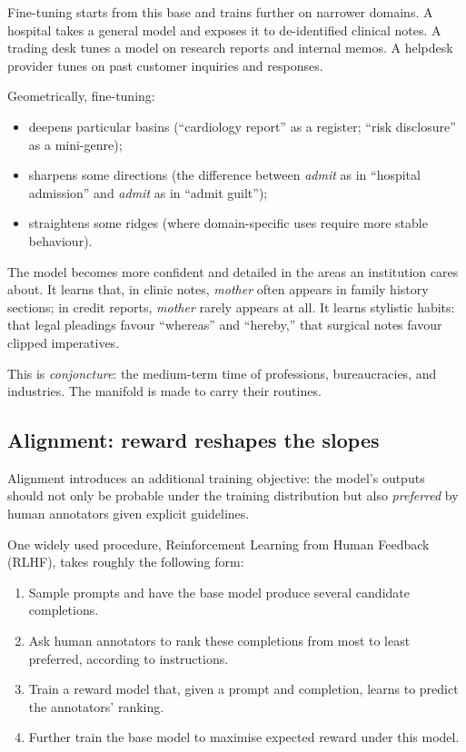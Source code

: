 \documentclass[12pt,a4paper]{article}
\begin{document}
Fine-tuning starts from this base and trains further on narrower domains. A hospital takes a general model and exposes it to de-identified clinical notes. A trading desk tunes a model on research reports and internal memos. A helpdesk provider tunes on past customer inquiries and responses.

Geometrically, fine-tuning:

\begin{itemize}
  \item deepens particular basins (``cardiology report'' as a register; ``risk disclosure'' as a mini-genre);
  \item sharpens some directions (the difference between \emph{admit} as in ``hospital admission'' and \emph{admit} as in ``admit guilt'');
  \item straightens some ridges (where domain-specific uses require more stable behaviour).
\end{itemize}

The model becomes more confident and detailed in the areas an institution cares about. It learns that, in clinic notes, \emph{mother} often appears in family history sections; in credit reports, \emph{mother} rarely appears at all. It learns stylistic habits: that legal pleadings favour ``whereas'' and ``hereby,'' that surgical notes favour clipped imperatives.

This is \emph{conjoncture}: the medium-term time of professions, bureaucracies, and industries. The manifold is made to carry their routines.

\subsection*{Alignment: reward reshapes the slopes}

Alignment introduces an additional training objective: the model's outputs should not only be probable under the training distribution but also \emph{preferred} by human annotators given explicit guidelines.

One widely used procedure, Reinforcement Learning from Human Feedback (RLHF), takes roughly the following form:

\begin{enumerate}
  \item Sample prompts and have the base model produce several candidate completions.
  \item Ask human annotators to rank these completions from most to least preferred, according to instructions.
  \item Train a reward model that, given a prompt and completion, learns to predict the annotators' ranking.
  \item Further train the base model to maximise expected reward under this model.
\end{enumerate}
\end{document}
